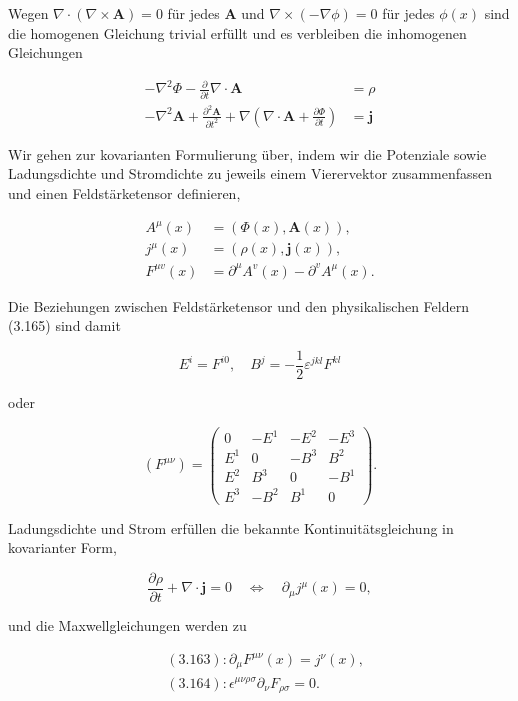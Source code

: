 \documentclass[10pt, letterpaper]{article}
\begin{document}
Wegen $\nabla \cdot(\nabla \times \mathbf{A})=0$ für jedes $\mathbf{A}$ und $\nabla \times(-\nabla \phi)=0$ für jedes $\phi(x)$ sind die homogenen Gleichung trivial erfüllt und es verbleiben die inhomogenen Gleichungen

$$
\begin{aligned}
-\nabla^{2} \Phi-\frac{\partial}{\partial t} \nabla \cdot \mathbf{A} & =\rho \\
-\nabla^{2} \mathbf{A}+\frac{\partial^{2} \mathbf{A}}{\partial t^{2}}+\nabla\left(\nabla \cdot \mathbf{A}+\frac{\partial \Phi}{\partial t}\right) & =\mathbf{j}
\end{aligned}
$$

Wir gehen zur kovarianten Formulierung über, indem wir die Potenziale sowie Ladungsdichte und Stromdichte zu jeweils einem Vierervektor zusammenfassen und einen Feldstärketensor definieren,

$$
\begin{aligned}
A^{\mu}(x) & =(\Phi(x), \mathbf{A}(x)), \\
j^{\mu}(x) & =(\rho(x), \mathbf{j}(x)), \\
F^{\mu v}(x) & =\partial^{\mu} A^{v}(x)-\partial^{v} A^{\mu}(x) .
\end{aligned}
$$

Die Beziehungen zwischen Feldstärketensor und den physikalischen Feldern (3.165) sind damit

$$
E^{i}=F^{i 0}, \quad B^{j}=-\frac{1}{2} \varepsilon^{j k l} F^{k l}
$$

oder

$$
\left(F^{\mu \nu}\right)=\left(\begin{array}{cccc}
0 & -E^{1} & -E^{2} & -E^{3} \\
E^{1} & 0 & -B^{3} & B^{2} \\
E^{2} & B^{3} & 0 & -B^{1} \\
E^{3} & -B^{2} & B^{1} & 0
\end{array}\right) .
$$

Ladungsdichte und Strom erfüllen die bekannte Kontinuitätsgleichung in kovarianter Form,

$$
\frac{\partial \rho}{\partial t}+\nabla \cdot \mathbf{j}=0 \quad \Leftrightarrow \quad \partial_{\mu} j^{\mu}(x)=0,
$$

und die Maxwellgleichungen werden zu

$$
\begin{aligned}
& (3.163): \partial_{\mu} F^{\mu \nu}(x)=j^{\nu}(x), \\
& (3.164): \epsilon^{\mu \nu \rho \sigma} \partial_{\nu} F_{\rho \sigma}=0 .
\end{aligned}
$$
\end{document}
